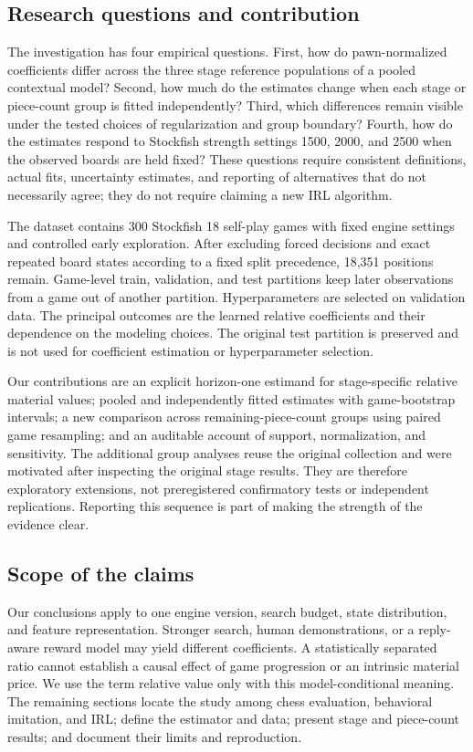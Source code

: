 \subsection{Research questions and contribution}
The investigation has four empirical questions. First, how do pawn-normalized coefficients differ across the three stage reference populations of a pooled contextual model? Second, how much do the estimates change when each stage or piece-count group is fitted independently? Third, which differences remain visible under the tested choices of regularization and group boundary? Fourth, how do the estimates respond to Stockfish strength settings 1500, 2000, and 2500 when the observed boards are held fixed? These questions require consistent definitions, actual fits, uncertainty estimates, and reporting of alternatives that do not necessarily agree; they do not require claiming a new IRL algorithm.

The dataset contains 300 Stockfish 18 self-play games with fixed engine settings and controlled early exploration. After excluding forced decisions and exact repeated board states according to a fixed split precedence, 18,351 positions remain. Game-level train, validation, and test partitions keep later observations from a game out of another partition. Hyperparameters are selected on validation data. The principal outcomes are the learned relative coefficients and their dependence on the modeling choices. The original test partition is preserved and is not used for coefficient estimation or hyperparameter selection.

Our contributions are an explicit horizon-one estimand for stage-specific relative material values; pooled and independently fitted estimates with game-bootstrap intervals; a new comparison across remaining-piece-count groups using paired game resampling; and an auditable account of support, normalization, and sensitivity. The additional group analyses reuse the original collection and were motivated after inspecting the original stage results. They are therefore exploratory extensions, not preregistered confirmatory tests or independent replications. Reporting this sequence is part of making the strength of the evidence clear.

\subsection{Scope of the claims}
Our conclusions apply to one engine version, search budget, state distribution, and feature representation. Stronger search, human demonstrations, or a reply-aware reward model may yield different coefficients. A statistically separated ratio cannot establish a causal effect of game progression or an intrinsic material price. We use the term relative value only with this model-conditional meaning. The remaining sections locate the study among chess evaluation, behavioral imitation, and IRL; define the estimator and data; present stage and piece-count results; and document their limits and reproduction.
